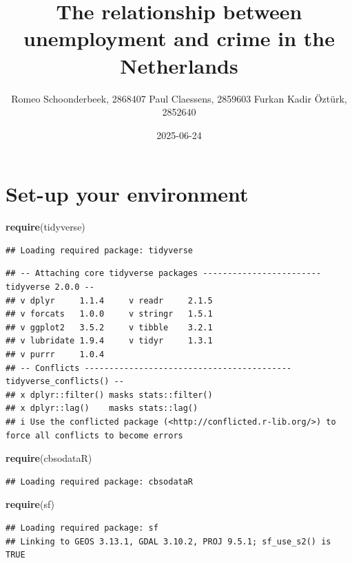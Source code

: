 \documentclass[
]{article}
\title{The relationship between unemployment and crime in the
Netherlands}
\author{Romeo Schoonderbeek, 2868407 Paul Claessens, 2859603 Furkan
Kadir Öztürk, 2852640}
\date{2025-06-24}
\newenvironment{Shaded}{\begin{snugshade}}{\end{snugshade}}
\newcommand{\FunctionTok}[1]{\textcolor[rgb]{0.13,0.29,0.53}{\textbf{#1}}}
\newcommand{\NormalTok}[1]{#1}
\begin{document}
\maketitle

\section{Set-up your environment}\label{set-up-your-environment}

\begin{Shaded}
\begin{Highlighting}[]
\FunctionTok{require}\NormalTok{(tidyverse)}
\end{Highlighting}
\end{Shaded}

\begin{verbatim}
## Loading required package: tidyverse
\end{verbatim}

\begin{verbatim}
## -- Attaching core tidyverse packages ------------------------ tidyverse 2.0.0 --
## v dplyr     1.1.4     v readr     2.1.5
## v forcats   1.0.0     v stringr   1.5.1
## v ggplot2   3.5.2     v tibble    3.2.1
## v lubridate 1.9.4     v tidyr     1.3.1
## v purrr     1.0.4     
## -- Conflicts ------------------------------------------ tidyverse_conflicts() --
## x dplyr::filter() masks stats::filter()
## x dplyr::lag()    masks stats::lag()
## i Use the conflicted package (<http://conflicted.r-lib.org/>) to force all conflicts to become errors
\end{verbatim}

\begin{Shaded}
\begin{Highlighting}[]
\FunctionTok{require}\NormalTok{(cbsodataR)}
\end{Highlighting}
\end{Shaded}

\begin{verbatim}
## Loading required package: cbsodataR
\end{verbatim}

\begin{Shaded}
\begin{Highlighting}[]
\FunctionTok{require}\NormalTok{(sf)}
\end{Highlighting}
\end{Shaded}

\begin{verbatim}
## Loading required package: sf
## Linking to GEOS 3.13.1, GDAL 3.10.2, PROJ 9.5.1; sf_use_s2() is TRUE
\end{verbatim}
\end{document}
